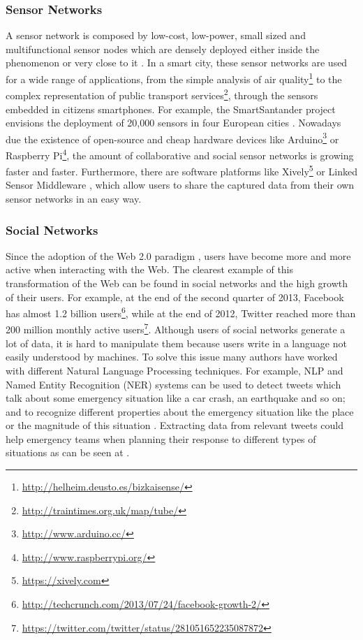 \subsubsection{Sensor Networks}\label{sensor_networks}

A sensor network is composed by low-cost, low-power, small sized and multifunctional sensor nodes which are densely deployed either inside the phenomenon or very close to it \cite{akyildiz_survey_2002}. In a smart city, these sensor networks are used for a wide range of applications, from the simple analysis of air quality\footnote{\url{http://helheim.deusto.es/bizkaisense/}} to the complex representation of public transport services\footnote{\url{http://traintimes.org.uk/map/tube/}}, through the sensors embedded in citizens smartphones. For example, the SmartSantander project envisions the deployment of 20,000 sensors in four European cities \cite{sanchez_smartsantander:_2011}. Nowadays due the existence of open-source and cheap hardware devices like Arduino\footnote{\url{http://www.arduino.cc/}} or Raspberry Pi\footnote{\url{http://www.raspberrypi.org/}}, the amount of collaborative and social sensor networks is growing faster and faster. Furthermore, there are software platforms like Xively\footnote{\url{https://xively.com}} or Linked Sensor Middleware \cite{le-phuoc_linked_2011}, which allow users to share the captured data from their own sensor networks in an easy way.

\subsubsection{Social Networks}\label{social_networks}

Since the adoption of the Web 2.0 paradigm \cite{oreilly_what_2007}, users have become more and more active when interacting with the Web. The clearest example of this transformation of the Web can be found in social networks and the high growth of their users. For example, at the end of the second quarter of 2013, Facebook has almost 1.2 billion users\footnote{\url{http://techcrunch.com/2013/07/24/facebook-growth-2/}}, while at the end of 2012, Twitter reached more than 200 million monthly active users\footnote{\url{https://twitter.com/twitter/status/281051652235087872}}. Although users of social networks generate a lot of data, it is hard to manipulate them because users write in a language not easily understood by machines. To solve this issue many authors have worked with different Natural Language Processing techniques. For example, NLP and Named Entity Recognition (NER) systems \cite{maynard_named_2001} can be used to detect tweets which talk about some emergency situation like a car crash, an earthquake and so on; and to recognize different properties about the emergency situation like the place or the magnitude of this situation \cite{sixto_enable_????,martins_machine_2010}. Extracting data from relevant tweets could help emergency teams when planning their response to different types of situations as can be seen at \cite{abel_twitcident:_2012,vieweg_microblogging_2010,hughes_twitter_2009}.



